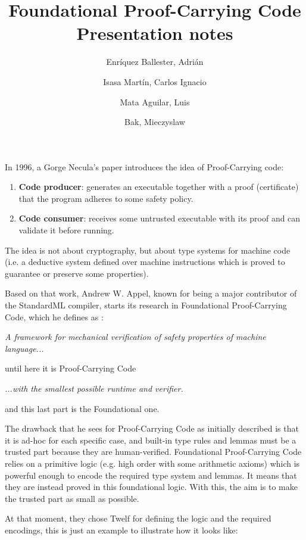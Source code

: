 \documentclass{article}
\title{
  Foundational Proof-Carrying Code \\
  \large Presentation notes  
}
\author{
  Enríquez Ballester, Adrián 
  \and
  Isasa Martín, Carlos Ignacio
  \and 
  Mata Aguilar, Luis
  \and 
  Bak, Mieczyslaw
}
\begin{document}
\maketitle

In 1996, a Gorge Necula's paper \cite{necula:pcc} 
introduces the idea of Proof-Carrying code:

\begin{enumerate}
  \item \textbf{Code producer}: generates an executable 
    together with a proof (certificate) that the program 
    adheres to some safety policy.
  \item \textbf{Code consumer}: receives some untrusted 
    executable with its proof and can validate it before 
    running.
\end{enumerate}

The idea is not about cryptography, but about type systems 
for machine code (i.e. a deductive system defined over 
machine instructions which is proved to guarantee or 
preserve some properties).

Based on that work, Andrew W. Appel, known for being a 
major contributor of the StandardML compiler, starts its 
research in Foundational Proof-Carrying Code, which he 
defines as \cite{appel:fpcc}:

\begin{center}
\textit{
  A framework for mechanical verification of safety 
  properties of machine language...
}
\end{center}

until here it is Proof-Carrying Code

\begin{center}
\textit{
  ...with the smallest possible runtime and verifier.
}
\end{center}

and this last part is the Foundational one. 

The drawback that he sees for Proof-Carrying Code as 
initially described is that it is ad-hoc for each specific 
case, and built-in type rules and lemmas must be a trusted 
part because they are human-verified. Foundational 
Proof-Carrying Code relies on a primitive logic (e.g. high 
order with some arithmetic axioms) which is powerful 
enough to encode the required type system and lemmas. It 
means that they are instead proved in this foundational 
logic. With this, the aim is to make the trusted part as 
small as possible.

At that moment, they chose Twelf for defining the logic and
the required encodings, this is just an example to 
illustrate how it looks like:
\end{document}
